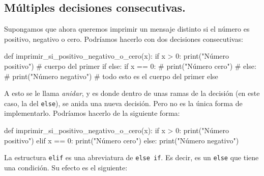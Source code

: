 \documentclass[
  letterpaper,
  DIV=11,
  numbers=noendperiod]{scrreprt}
\newenvironment{Shaded}{\begin{snugshade}}{\end{snugshade}}
\newcommand{\BuiltInTok}[1]{\textcolor[rgb]{0.00,0.23,0.31}{#1}}
\newcommand{\CommentTok}[1]{\textcolor[rgb]{0.37,0.37,0.37}{#1}}
\newcommand{\ControlFlowTok}[1]{\textcolor[rgb]{0.00,0.23,0.31}{#1}}
\newcommand{\DecValTok}[1]{\textcolor[rgb]{0.68,0.00,0.00}{#1}}
\newcommand{\KeywordTok}[1]{\textcolor[rgb]{0.00,0.23,0.31}{#1}}
\newcommand{\NormalTok}[1]{\textcolor[rgb]{0.00,0.23,0.31}{#1}}
\newcommand{\OperatorTok}[1]{\textcolor[rgb]{0.37,0.37,0.37}{#1}}
\newcommand{\StringTok}[1]{\textcolor[rgb]{0.13,0.47,0.30}{#1}}
\begin{document}
\subsection{Múltiples decisiones
consecutivas.}\label{muxfaltiples-decisiones-consecutivas.}

Supongamos que ahora queremos imprimir un mensaje distinto si el número
es positivo, negativo o cero. Podríamos hacerlo con dos decisiones
consecutivas:

\begin{Shaded}
\begin{Highlighting}[]
\KeywordTok{def}\NormalTok{ imprimir\_si\_positivo\_negativo\_o\_cero(x):}
  \ControlFlowTok{if}\NormalTok{ x }\OperatorTok{\textgreater{}} \DecValTok{0}\NormalTok{:}
      \BuiltInTok{print}\NormalTok{(}\StringTok{"Número positivo"}\NormalTok{) }\CommentTok{\# cuerpo del primer if}
  \ControlFlowTok{else}\NormalTok{:}
      \ControlFlowTok{if}\NormalTok{ x }\OperatorTok{==} \DecValTok{0}\NormalTok{:                      }\CommentTok{\#}
          \BuiltInTok{print}\NormalTok{(}\StringTok{"Número cero"}\NormalTok{)        }\CommentTok{\#}
      \ControlFlowTok{else}\NormalTok{:                           }\CommentTok{\#}
          \BuiltInTok{print}\NormalTok{(}\StringTok{"Número negativo"}\NormalTok{)    }\CommentTok{\# todo esto es el cuerpo del primer else}
\end{Highlighting}
\end{Shaded}

A esto se le llama \emph{anidar}, y es donde dentro de unas ramas de la
decisión (en este caso, la del \texttt{else}), se anida una nueva
decisión. Pero no es la única forma de implementarlo. Podríamos hacerlo
de la siguiente forma:

\begin{Shaded}
\begin{Highlighting}[]
\KeywordTok{def}\NormalTok{ imprimir\_si\_positivo\_negativo\_o\_cero(x):}
  \ControlFlowTok{if}\NormalTok{ x }\OperatorTok{\textgreater{}} \DecValTok{0}\NormalTok{:}
      \BuiltInTok{print}\NormalTok{(}\StringTok{"Número positivo"}\NormalTok{)}
  \ControlFlowTok{elif}\NormalTok{ x }\OperatorTok{==} \DecValTok{0}\NormalTok{:}
      \BuiltInTok{print}\NormalTok{(}\StringTok{"Número cero"}\NormalTok{)}
  \ControlFlowTok{else}\NormalTok{:}
      \BuiltInTok{print}\NormalTok{(}\StringTok{"Número negativo"}\NormalTok{)}
\end{Highlighting}
\end{Shaded}

La estructura \texttt{elif} es una abreviatura de \texttt{else\ if}. Es
decir, es un \texttt{else} que tiene una condición. Su efecto es el
siguiente:
\end{document}
